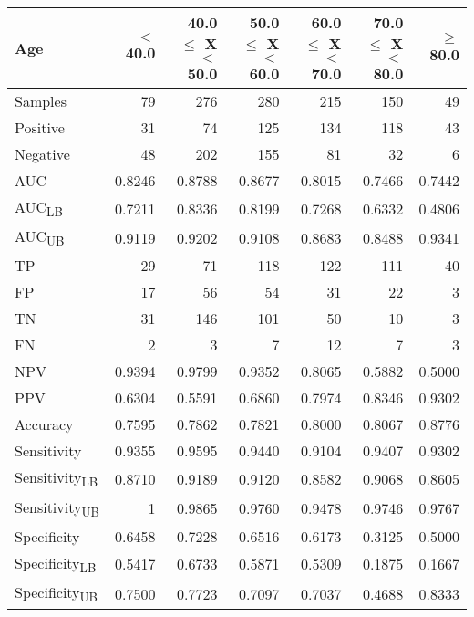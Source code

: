 \begin{tabular}{lrrrrrr}
\toprule
Age & $<$ 40.0 & 40.0 $\leq$ X $<$ 50.0 & 50.0 $\leq$ X $<$ 60.0 & 60.0 $\leq$ X $<$ 70.0 & 70.0 $\leq$ X $<$ 80.0 & $\geq$ 80.0 \\
\midrule
Samples & 79 & 276 & 280 & 215 & 150 & 49 \\
Positive & 31 & 74 & 125 & 134 & 118 & 43 \\
Negative & 48 & 202 & 155 & 81 & 32 & 6 \\
AUC & 0.8246 & 0.8788 & 0.8677 & 0.8015 & 0.7466 & 0.7442 \\
AUC\textsubscript{LB} & 0.7211 & 0.8336 & 0.8199 & 0.7268 & 0.6332 & 0.4806 \\
AUC\textsubscript{UB} & 0.9119 & 0.9202 & 0.9108 & 0.8683 & 0.8488 & 0.9341 \\
TP & 29 & 71 & 118 & 122 & 111 & 40 \\
FP & 17 & 56 & 54 & 31 & 22 & 3 \\
TN & 31 & 146 & 101 & 50 & 10 & 3 \\
FN & 2 & 3 & 7 & 12 & 7 & 3 \\
NPV & 0.9394 & 0.9799 & 0.9352 & 0.8065 & 0.5882 & 0.5000 \\
PPV & 0.6304 & 0.5591 & 0.6860 & 0.7974 & 0.8346 & 0.9302 \\
Accuracy & 0.7595 & 0.7862 & 0.7821 & 0.8000 & 0.8067 & 0.8776 \\
Sensitivity & 0.9355 & 0.9595 & 0.9440 & 0.9104 & 0.9407 & 0.9302 \\
Sensitivity\textsubscript{LB} & 0.8710 & 0.9189 & 0.9120 & 0.8582 & 0.9068 & 0.8605 \\
Sensitivity\textsubscript{UB} & 1 & 0.9865 & 0.9760 & 0.9478 & 0.9746 & 0.9767 \\
Specificity & 0.6458 & 0.7228 & 0.6516 & 0.6173 & 0.3125 & 0.5000 \\
Specificity\textsubscript{LB} & 0.5417 & 0.6733 & 0.5871 & 0.5309 & 0.1875 & 0.1667 \\
Specificity\textsubscript{UB} & 0.7500 & 0.7723 & 0.7097 & 0.7037 & 0.4688 & 0.8333 \\
\bottomrule
\end{tabular}
